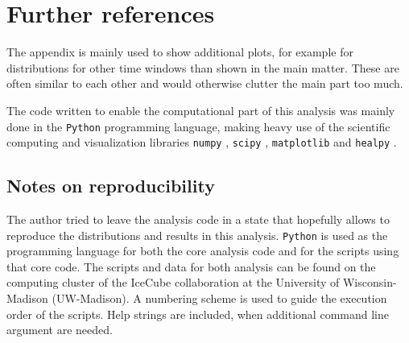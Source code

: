 \chapter{Further references}
The appendix is mainly used to show additional plots, for example for distributions for other time windows than shown in the main matter.
These are often similar to each other and would otherwise clutter the main part too much.

The code written to enable the computational part of this analysis was mainly done in the \lstinline!Python! programming language, making heavy use of the scientific computing and visualization libraries \lstinline!numpy! \cite{numpy}, \lstinline!scipy! \cite{scipy}, \lstinline!matplotlib! \cite{matplotlib} and \lstinline!healpy! \cite{Gorski:2004by}.

\section{Notes on reproducibility}
The author tried to leave the analysis code in a state that hopefully allows to reproduce the distributions and results in this analysis.
\lstinline!Python! is used as the programming language for both the core analysis code and for the scripts using that core code.
The scripts and data for both analysis can be found on the computing cluster of the IceCube collaboration at the University of Wisconsin-Madison (UW-Madison).
A numbering scheme is used to guide the execution order of the scripts.
Help strings are included, when additional command line argument are needed.

